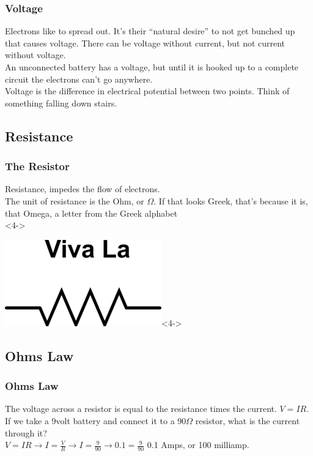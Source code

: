 \documentclass[10pt]{beamer}
\begin{document}
\begin{frame}
\frametitle{Voltage}
Electrons like to spread out. It's their ``natural desire'' to not get bunched up that causes voltage. There can be voltage without current, but not current without voltage.\\
An unconnected battery has a voltage, but until it is hooked up to a complete circuit the electrons can't go anywhere.\\
Voltage is the difference in electrical potential between two points. Think of something falling down stairs.
\end{frame}

\subsection{Resistance}

\begin{frame}
\frametitle{The Resistor}
Resistance, impedes the flow of electrons.\\
The unit of resistance is the Ohm, or $\Omega$. \pause If that looks Greek, that's because it is, that Omega, a letter from the Greek alphabet\\  <4->
\begin{center}
\includegraphics[width=.25\textwidth]{viva.png}<4->
\end{center}
\end{frame}

\subsection{Ohms Law}
\begin{frame}
\frametitle{Ohms Law}
The voltage across a resistor is equal to the resistance times the current. $V=IR$.\\
If we take a 9volt battery and connect it to a 90$\Omega$ resistor, what is the current through it?\pause\\
$V=IR\to I=\frac{V}{R}\to I=\frac{9}{90}$\pause$\to 0.1=\frac{9}{90}$ 0.1 Amps, or 100 milliamp.
\end{frame}
\end{document}
